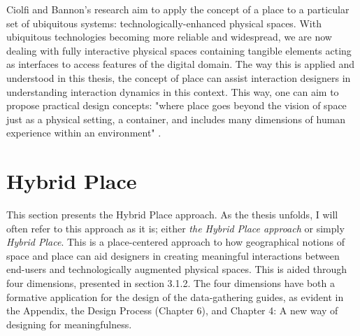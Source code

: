 Ciolfi and Bannon's research aim to apply the concept of a place to a particular set of ubiquitous systems: technologically-enhanced physical spaces. With ubiquitous technologies becoming more reliable and widespread, we are now dealing with fully interactive physical spaces containing tangible elements acting as interfaces to access features of the digital domain. The way this is applied and understood in this thesis, the concept of place can assist interaction designers in understanding interaction dynamics in this context. This way, one can aim to propose practical design concepts: "where place goes beyond the vision of space just as a physical setting, a container, and includes many dimensions of human experience within an environment" \autocite[p. 221]{ciolfi_space_2005}.


\break
\section{Hybrid Place}
This section presents the Hybrid Place approach. As the thesis unfolds, I will often refer to this approach as it is; either \emph{the Hybrid Place approach} or simply \emph{Hybrid Place}. This is a place-centered approach to how geographical notions of space and place can aid designers in creating meaningful interactions between end-users and technologically augmented physical spaces. This is aided through four dimensions, presented in section 3.1.2. The four dimensions have both a formative application for the design of the data-gathering guides, as evident in the Appendix, the Design Process (Chapter 6), and Chapter 4: A new way of designing for meaningfulness.

